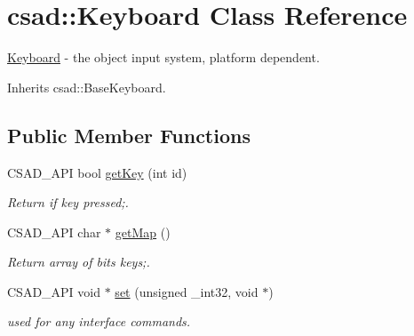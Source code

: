 \hypertarget{classcsad_1_1_keyboard}{\section{csad\-:\-:Keyboard Class Reference}
\label{classcsad_1_1_keyboard}
}


\hyperlink{classcsad_1_1_keyboard}{Keyboard} -\/ the object input system, platform dependent.  




Inherits csad\-::\-Base\-Keyboard.

\subsection*{Public Member Functions}
\begin{DoxyCompactItemize}
\item 
\hypertarget{classcsad_1_1_keyboard_a71846e6913baa68e34d5b7024b2e6683}{C\-S\-A\-D\-\_\-\-A\-P\-I bool \hyperlink{classcsad_1_1_keyboard_a71846e6913baa68e34d5b7024b2e6683}{get\-Key} (int id)}\label{classcsad_1_1_keyboard_a71846e6913baa68e34d5b7024b2e6683}

\begin{DoxyCompactList}\small\item\em Return if key pressed;. \end{DoxyCompactList}\item 
\hypertarget{classcsad_1_1_keyboard_aae4475094b70b614bb5acde35dfaf65e}{C\-S\-A\-D\-\_\-\-A\-P\-I char $\ast$ \hyperlink{classcsad_1_1_keyboard_aae4475094b70b614bb5acde35dfaf65e}{get\-Map} ()}\label{classcsad_1_1_keyboard_aae4475094b70b614bb5acde35dfaf65e}

\begin{DoxyCompactList}\small\item\em Return array of bits keys;. \end{DoxyCompactList}\item 
\hypertarget{classcsad_1_1_keyboard_a192d3a7516da6ca21d3ebe82a6b2507c}{C\-S\-A\-D\-\_\-\-A\-P\-I void $\ast$ \hyperlink{classcsad_1_1_keyboard_a192d3a7516da6ca21d3ebe82a6b2507c}{set} (unsigned \-\_\-int32, void $\ast$)}\label{classcsad_1_1_keyboard_a192d3a7516da6ca21d3ebe82a6b2507c}

\begin{DoxyCompactList}\small\item\em used for any interface commands. \end{DoxyCompactList}\end{DoxyCompactItemize}
